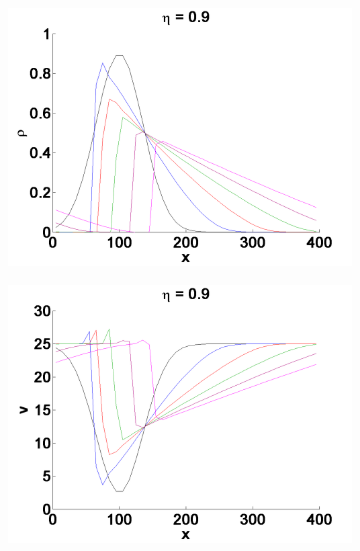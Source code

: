 \begin{figure}[h!]
\begin{subfigure}{.375\textwidth}
	\centering
	\includegraphics[width=\textwidth]{img/exc3_p_09}
	\caption{}
	\label{fig:exc3_congestion_eta01_p}
\end{subfigure}
\begin{subfigure}{.375\textwidth}
	\centering
	\includegraphics[width=\textwidth]{img/exc3_v_09}
	\caption{}
	\label{fig:exc3_congestion_eta01_v}
\end{subfigure}
\begin{subfigure}{.09\textwidth}
	\centering

\end{subfigure}
\end{figure}
